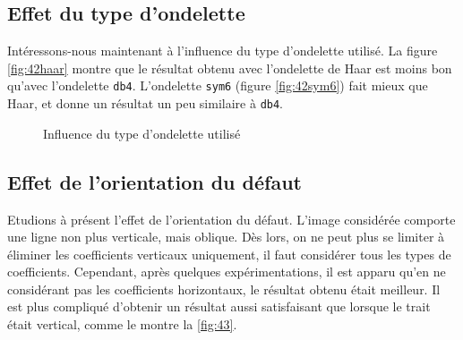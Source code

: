 \documentclass[12pt]{article}
\begin{document}
\subsection{Effet du type d'ondelette}
Intéressons-nous maintenant à l'influence du type d'ondelette utilisé. La figure \autoref{fig:42haar} montre que le résultat obtenu avec l'ondelette de Haar est moins bon qu'avec l'ondelette \texttt{db4}. L'ondelette \texttt{sym6} (figure \ref{fig:42sym6}) fait mieux que Haar, et donne un résultat un peu similaire à \texttt{db4}.

\begin{figure}[!h] 
	\centering
	\quad
	\caption{Influence du type d'ondelette utilisé} 
	\label{}
\end{figure}



\subsection{Effet de l'orientation du défaut}
Etudions à présent l'effet de l'orientation du défaut. L'image considérée comporte une ligne non plus verticale, mais oblique. Dès lors, on ne peut plus se limiter à éliminer les coefficients verticaux uniquement, il faut considérer tous les types de coefficients. Cependant, après quelques expérimentations, il est apparu qu'en ne considérant pas les coefficients horizontaux, le résultat obtenu était meilleur. Il est plus compliqué d'obtenir un résultat aussi satisfaisant que lorsque le trait était vertical, comme le montre la \autoref{fig:43}.
\end{document}
